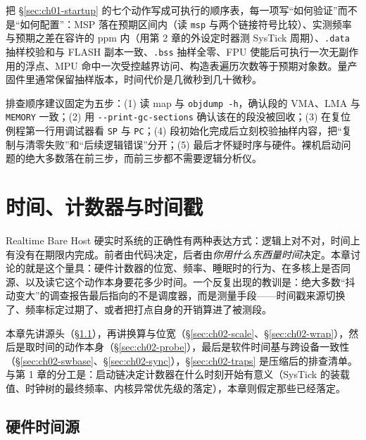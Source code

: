 \documentclass[12pt,a4paper,fontset=fandol]{ctexbook}
\newcommand{\Tp}[1]{\texttt{#1}}
\newcommand{\Opt}[1]{\texttt{-\/-#1}}
\newcommand{\Lang}[1]{\textsf{#1}}
\newcommand{\DomBare}{\Lang{Bare}}
\newcommand{\DomRT}{\Lang{Realtime}}
\newcommand{\DomHost}{\Lang{Host}}
\begin{document}
\begin{bestpractice}[title={把启动动作做成上电自检清单}]
把 \S\ref{sec:ch01-startup} 的七个动作写成可执行的顺序表，每一项写``如何验证''而不是``如何配置''：MSP 落在预期区间内（读 \Tp{msp} 与两个链接符号比较）、实测频率与预期之差在容许的 ppm 内（用第 2 章的外设定时器测 SysTick 周期）、\Tp{.data} 抽样校验和与 FLASH 副本一致、\Tp{.bss} 抽样全零、FPU 使能后可执行一次无副作用的浮点、MPU 命中一次受控越界访问、构造表遍历次数等于预期对象数。量产固件里通常保留抽样版本，时间代价是几微秒到几十微秒。
\end{bestpractice}

排查顺序建议固定为五步：(1) 读 map 与 \Tp{objdump -h}，确认段的 VMA、LMA 与 \Tp{MEMORY} 一致；(2) 用 \Opt{print-gc-sections} 确认该在的段没被回收；(3) 在复位例程第一行用调试器看 \Tp{SP} 与 \Tp{PC}；(4) 段初始化完成后立刻校验抽样内容，把``复制与清零失败''和``后续逻辑错误''分开；(5) 最后才怀疑时序与硬件。裸机启动问题的绝大多数落在前三步，而前三步都不需要逻辑分析仪。

\chapter{时间、计数器与时间戳}

\label{ch:ch02-time-counters}

\DomRT{} \DomBare{} \DomHost{} 硬实时系统的正确性有两种表达方式：逻辑上对不对，时间上有没有在期限内完成。前者由代码决定，后者由\emph{你用什么东西量时间}决定。本章讨论的就是这个量具：硬件计数器的位宽、频率、睡眠时的行为、在多核上是否同源、以及读它这个动作本身要花多少时间。一个反复出现的教训是：绝大多数``抖动变大''的调查报告最后指向的不是调度器，而是测量手段——时间戳来源切换了、频率标定过期了、或者把打点自身的开销算进了被测段。

本章先讲源头（\S\ref{sec:ch02-source}），再讲换算与位宽（\S\ref{sec:ch02-scale}、\S\ref{sec:ch02-wrap}），然后是取时间的动作本身（\S\ref{sec:ch02-probe}），最后是软件时间基与跨设备一致性（\S\ref{sec:ch02-swbase}、\S\ref{sec:ch02-sync}），\S\ref{sec:ch02-traps} 是压缩后的排查清单。与第 1 章的分工是：启动链决定计数器在什么时刻开始有意义（SysTick 的装载值、时钟树的最终频率、内核异常优先级的落定），本章则假定那些已经落定。

\section{硬件时间源}

\label{sec:ch02-source}
\end{document}

